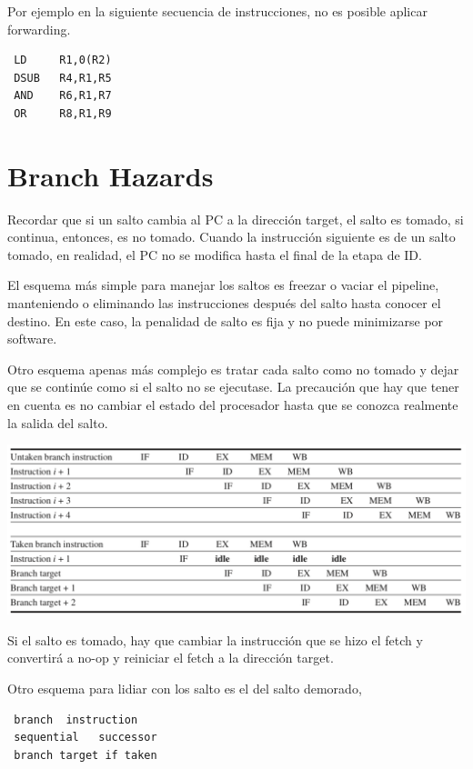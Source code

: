 Por ejemplo en la siguiente secuencia de instrucciones, no es posible aplicar forwarding.

\begin{verbatim}
 LD     R1,0(R2) 
 DSUB   R4,R1,R5 
 AND    R6,R1,R7 
 OR     R8,R1,R9
\end{verbatim}


\section{Branch Hazards}

Recordar que si un salto cambia al PC a la dirección target, el salto es tomado, si continua, entonces, es no tomado. Cuando la instrucción siguiente es de un salto tomado, en realidad, el PC no se modifica hasta el final de la etapa de ID.

El esquema más simple para manejar los saltos es freezar o vaciar el pipeline, manteniendo o eliminando las instrucciones después del salto hasta conocer el destino. En este caso, la penalidad de salto es fija y no puede minimizarse por software.

Otro esquema apenas más complejo es tratar cada salto como no tomado y dejar que se continúe como si el salto no se ejecutase. La precaución que hay que tener en cuenta es no cambiar el estado del procesador hasta que se conozca realmente la salida del salto. 

\begin{center}
 \includegraphics[scale=.5,keepaspectratio=true]{gfx/pipeline0.png}
\end{center}

Si el salto es tomado, hay que cambiar la instrucción que se hizo el fetch y convertirá a no-op y reiniciar el fetch a la dirección target.


Otro esquema para lidiar con los salto es el del salto demorado,

\begin{verbatim}
 branch  instruction
 sequential   successor
 branch target if taken
\end{verbatim}

